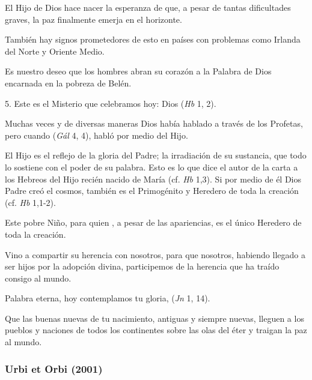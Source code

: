 \begin{body}
							El Hijo de Dios hace nacer la esperanza de que, a pesar de tantas dificultades graves, la paz finalmente emerja en el horizonte.
							
							También hay signos prometedores de esto en países con problemas como Irlanda del Norte y Oriente Medio.
							
							Es nuestro deseo que los hombres abran su corazón a la Palabra de Dios encarnada en la pobreza de Belén.
							
							5. Este es el Misterio que celebramos hoy: Dios  (\emph{Hb} 1, 2).
							
							Muchas veces y de diversas maneras Dios había hablado a través de los Profetas, pero cuando  (\emph{Gál} 4, 4), habló por medio del Hijo.
							
							El Hijo es el reflejo de la gloria del Padre; la irradiación de su sustancia, que todo lo sostiene con el poder de su palabra. Esto es lo que dice el autor de la carta a los Hebreos del Hijo recién nacido de María (cf. \emph{Hb} 1,3). Si por medio de él Dios Padre creó el cosmos, también es el Primogénito y Heredero de toda la creación (cf. \emph{Hb} 1,1-2).
							
							Este pobre Niño, para quien , a pesar de las apariencias, es el único Heredero de toda la creación.
							
							Vino a compartir su herencia con nosotros, para que nosotros, habiendo llegado a ser hijos por la adopción divina, participemos de la herencia que ha traído consigo al mundo.
							
							Palabra eterna, hoy contemplamos tu gloria,  (\emph{Jn} 1, 14).
							
							Que las buenas nuevas de tu nacimiento, antiguas y siempre nuevas, lleguen a los pueblos y naciones de todos los continentes sobre las olas del éter y traigan la paz al mundo.
						\end{body}


					\subsubsection{Urbi et Orbi (2001)} 
					
